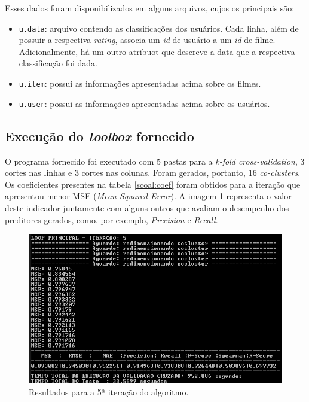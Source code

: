 \vspace{12pt}

Esses dados foram disponibilizados em alguns arquivos, cujos os principais são:

\begin{itemize}
  \item \texttt{u.data}: arquivo contendo as classificações dos usuários. Cada
  linha, além de possuir a respectiva \textit{rating}, associa um \textit{id} de
  usuário a um \textit{id} de filme. Adicionalmente, há um outro atribuot que
  descreve a data que a respectiva classificação foi dada.

  \item \texttt{u.item}: possui as informações apresentadas acima sobre os
  filmes.
  
  \item \texttt{u.user}: possui as informações apresentadas acima sobre os
  usuários.
  
\end{itemize}

\subsection{Execução do \textit{toolbox} fornecido}

O programa fornecido foi executado com 5 pastas para a \textit{k-fold
cross-validation}, 3 cortes nas linhas e 3 cortes nas colunas.
Foram gerados, portanto, 16 \textit{co-clusters}. Os coeficientes presentes na
tabela \ref{scoal:coef} foram obtidos para a iteração que apresentou menor MSE
(\textit{Mean Squared Error}). A imagem \ref{fig:scoal_result} representa o
valor deste indicador juntamente com alguns outros que avaliam o desempenho dos
preditores gerados, como. por exemplo, \textit{Precision} e \textit{Recall}. 

\FloatBarrier
	
	\begin{figure}[h]
    \centering
    \includegraphics[scale=0.65]{image/execucaoScoal}
    \caption{\label{fig:scoal_result}Resultados para a 5ª iteração do
    algoritmo.}
	\end{figure}  
	

